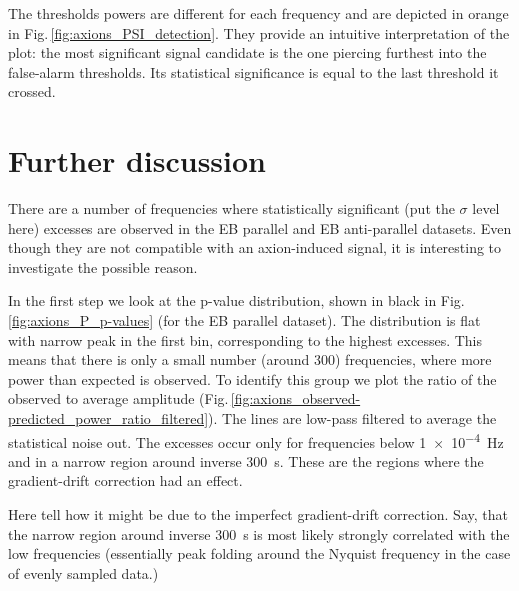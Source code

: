 The thresholds powers are different for each frequency and are depicted in orange in Fig.\,\ref{fig:axions_PSI_detection}. They provide an intuitive interpretation of the plot: the most significant signal candidate is the one piercing furthest into the false-alarm thresholds. Its statistical significance is equal to the last threshold it crossed.



\section{Further discussion}
There are a number of frequencies where statistically significant (put the $\sigma$ level here) excesses are observed in the EB parallel and EB anti-parallel datasets. 
Even though they are not compatible with an axion-induced signal, it is interesting to investigate the possible reason.

In the first step we look at the p-value distribution, shown in black in Fig.\,\ref{fig:axions_P_p-values} (for the EB parallel dataset).
The distribution is flat with narrow peak in the first bin, corresponding to the highest excesses.
This means that there is only a small number (around 300) frequencies, where more power than expected is observed.
To identify this group we plot the ratio of the observed to average amplitude (Fig.\,\ref{fig:axions_observed-predicted_power_ratio_filtered}). The lines are low-pass filtered to average the statistical noise out. The excesses occur only for frequencies below \SI{1e-4}{\hertz} and in a narrow region around inverse \SI{300}{\second}. These are the regions where the gradient-drift correction had an effect.

Here tell how it might be due to the imperfect gradient-drift correction. Say, that the narrow region around inverse \SI{300}{\second} is most likely strongly correlated with the low frequencies (essentially peak folding around the Nyquist frequency in the case of evenly sampled data.)


